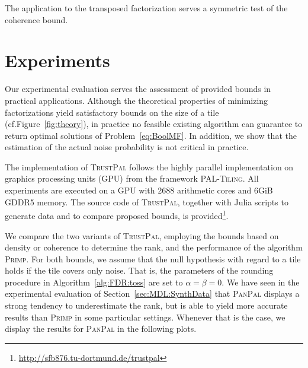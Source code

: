 The application to the transposed factorization serves a symmetric test of the coherence bound. 
\section{Experiments}\label{sec:TP:experiments}
Our experimental evaluation serves the assessment of provided bounds in practical applications. Although the theoretical properties of minimizing factorizations yield satisfactory bounds on the size of a tile (cf.\@ Figure~\ref{fig:theory}), in practice no feasible existing algorithm can guarantee to return optimal solutions of Problem~\eqref{eq:BoolMF}. 
In addition, we show that the estimation of the actual noise probability is not critical in practice.

The implementation of \textsc{TrustPal} follows the highly parallel implementation on graphics processing units (GPU) from the framework \textsc{PAL-Tiling}. All experiments are executed on a GPU with 2688 arithmetic cores and 6GiB GDDR5 memory. The source code of \textsc{TrustPal}, together with Julia scripts to generate data and to compare proposed bounds, is provided\footnote{\url{http://sfb876.tu-dortmund.de/trustpal}}.

We compare the two variants of \textsc{TrustPal}, employing the  bounds based on  density or coherence to determine the rank, and the performance of the algorithm \textsc{Primp}. For both bounds, we assume that the null hypothesis with regard to a tile holds if the tile covers only noise. That is, the parameters of the rounding procedure in Algorithm~\ref{alg:FDR:toss} are set to   $\alpha=\beta=0$. We have seen in the experimental evaluation of Section~\ref{sec:MDL:SynthData} that \textsc{PanPal} displays a strong tendency to underestimate the rank, but is able to yield more accurate results than \textsc{Primp} in some particular settings. Whenever that is the case, we display the results for \textsc{PanPal} in the following plots. 
